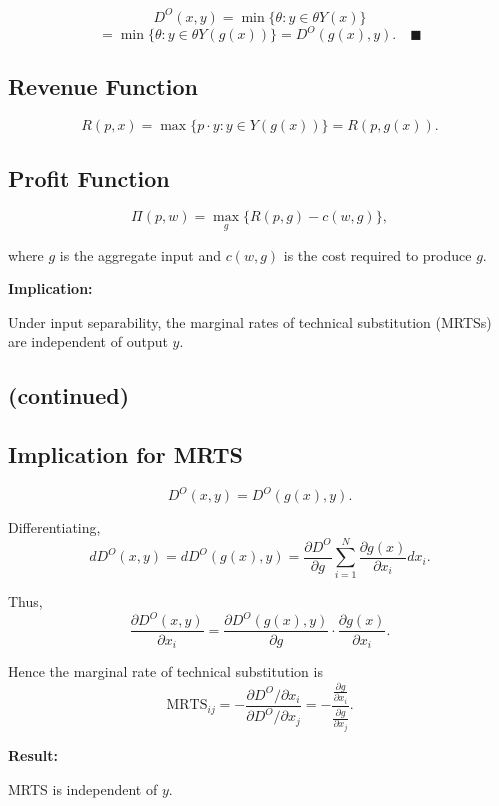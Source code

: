 \[
D^O(x,y)
=
\min \{\theta : y \in \theta Y(x)\}
\]
\[
=
\min \{\theta : y \in \theta Y(g(x))\}
=
D^O(g(x),y).
\quad \blacksquare
\]

\subsection*{Revenue Function}

\[
R(p,x)
=
\max \{p\cdot y : y \in Y(g(x))\}
=
R(p,g(x)).
\]

\subsection*{Profit Function}

\[
\Pi(p,w)
=
\max_g \{R(p,g) - c(w,g)\},
\]

where $g$ is the aggregate input and $c(w,g)$ is the cost required to produce $g$.

\medskip

\textbf{Implication:}

Under input separability, the marginal rates of technical substitution (MRTSs)
are independent of output $y$.



\subsection*{(continued)}

\subsection*{Implication for MRTS}

\[
D^O(x,y)=D^O(g(x),y).
\]

Differentiating,
\[
dD^O(x,y)
=
dD^O(g(x),y)
=
\frac{\partial D^O}{\partial g} \sum_{i=1}^N \frac{\partial g(x)}{\partial x_i} dx_i.
\]

Thus,
\[
\frac{\partial D^O(x,y)}{\partial x_i}
=
\frac{\partial D^O(g(x),y)}{\partial g}
\cdot
\frac{\partial g(x)}{\partial x_i}.
\]

Hence the marginal rate of technical substitution is
\[
\text{MRTS}_{ij}
=
-
\frac{\partial D^O/\partial x_i}{\partial D^O/\partial x_j}
=
-
\frac{\frac{\partial g}{\partial x_i}}{\frac{\partial g}{\partial x_j}}.
\]

\medskip

\textbf{Result:}

MRTS is independent of $y$.

\medskip

